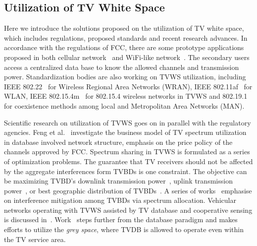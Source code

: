 \subsection{Utilization of TV White Space}
Here we introduce the solutions proposed on the utilization of TV white space, which includes regulations, proposed standards and recent research advances.
In accordance with the regulations of FCC, there are some prototype applications proposed in both cellular network~\cite{tvwhite_lte2011, multicell_geo_dyspan11} and WiFi-like network~\cite{whitefi09}.
The secondary users access a centralized data base to know the allowed channels and transmission power.
%
Standardization bodies are also working on TVWS utilization, including IEEE 802.22~\cite{802.22} for Wireless Regional Area Networks (\gls{WRAN}), IEEE 802.11af~\cite{802.11af} for WLAN, IEEE 802.15.4m~\cite{802.15.4m} for 802.15.4 wireless networks in TVWS and 802.19.1~\cite{802.19} for coexistence methods among local and Metropolitan Area Networks (\gls{MAN}).


Scientific research on utilization of TVWS goes on in parallel with the regulatory agencies.
Feng et al.~\cite{hybridPricing_tvspace_2014} investigate the business model of TV spectrum utilization in database involved network structure, emphasis on the price policy of the channels approved by FCC.
Spectrum sharing in TVWS is formulated as a series of optimization problems. 
The guarantee that TV receivers should not be affected by the aggregate interferences form TVBDs is one constraint.
The objective can be maximizing TVBD's downlink transmission power~\cite{multipleIntf_pimrc11}, uplink transmission power~\cite{uplink_power_tvws13}, or best geographic distribution of TVBDs~\cite{withinTVcoverage_PIMRC13}.
A series of works~\cite{game_CA_association_ICDCS12,SA_CA_TVWS_2012crowncom, 802.22co-existence09, 802.22game_08globecom,self-coexistenceWRAN2010infocom} emphasise on interference mitigation among TVBDs via spectrum allocation.
Vehicular networks operating with TVWS assisted by TV database and cooperative sensing is discussed in~\cite{tvws_vtc13}.
Work~\cite{increaseTVWS12} steps further from the database paradigm and makes efforts to utilize the \textit{grey space}, where TVDB is allowed to operate even within the TV service area.

